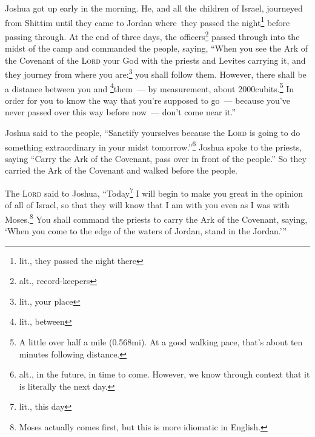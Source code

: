 
\begin{inparaenum}
     Joshua got up early in the morning. He, and all the children of Israel, journeyed from Shittim until they came to Jordan where\understood\ they passed the night\footnote{lit., they passed the night there} before passing through.%
     At the end of three days, the officers\footnote{alt., record-keepers} passed through into the midst of the camp%
     and commanded the people, saying, ``When you see the Ark of the Covenant of the \textsc{Lord} your God with the priests and Levites carrying it, and they journey from where you are:\footnote{lit., your place} you shall follow them.%
     However, there shall be a distance between you and \footnote{lit., between}them~--- by measurement, about 2\hspace*{0.25em}000\hspace*{0.5em}cu\-bits.\footnote{A little over half a mile (0.568\thinspace mi). At a good walking pace, that's about ten minutes following distance.} In order for you to know the way that you're supposed to go~--- because you've never passed over this way before now~--- don't come near it.''%
    
     Joshua said to the people, ``Sanctify yourselves because the \textsc{Lord} is going to do something extraordinary in your midst tomorrow.''\footnote{alt., in the future, in time to come. However, we know through context that it is literally the next day.}%
     Joshua spoke to the priests, saying ``Carry the Ark of the Covenant, pass over in front of the people.'' So they carried the Ark of the Covenant and walked before the people.%
    
     The \textsc{Lord} said to Joshua, ``Today\footnote{lit., this day} I will begin to make you great in the opinion of all of Israel, so that they will know that I am with you even as I was with Moses.\footnote{Moses actually comes first, but this is more idiomatic in English.}%
     You shall command the priests to carry the Ark of the Covenant, saying, `When you come to the edge of the waters of Jordan, stand in the Jordan.'\thinspace''%
    

\end{inparaenum}
